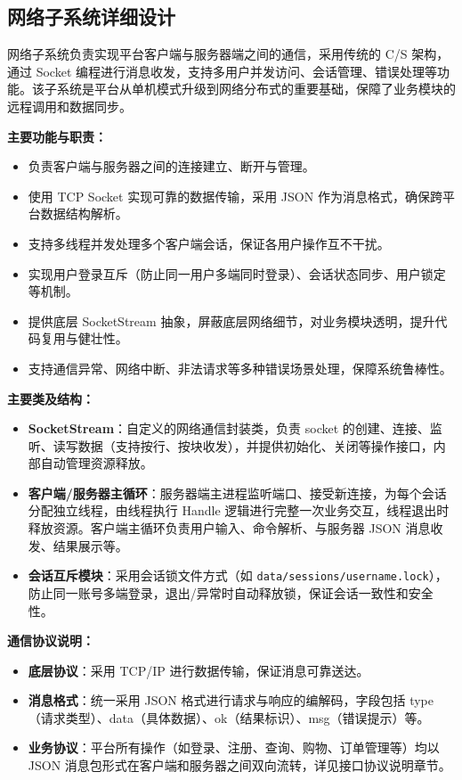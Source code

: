 \documentclass[11pt]{article}
\begin{document}
\subsection{网络子系统详细设计}

网络子系统负责实现平台客户端与服务器端之间的通信，采用传统的 C/S 架构，通过 Socket 编程进行消息收发，支持多用户并发访问、会话管理、错误处理等功能。该子系统是平台从单机模式升级到网络分布式的重要基础，保障了业务模块的远程调用和数据同步。

\vspace{0.5em}
\textbf{主要功能与职责：}
\begin{itemize}
    \item 负责客户端与服务器之间的连接建立、断开与管理。
    \item 使用 TCP Socket 实现可靠的数据传输，采用 JSON 作为消息格式，确保跨平台数据结构解析。
    \item 支持多线程并发处理多个客户端会话，保证各用户操作互不干扰。
    \item 实现用户登录互斥（防止同一用户多端同时登录）、会话状态同步、用户锁定等机制。
    \item 提供底层 SocketStream 抽象，屏蔽底层网络细节，对业务模块透明，提升代码复用与健壮性。
    \item 支持通信异常、网络中断、非法请求等多种错误场景处理，保障系统鲁棒性。
\end{itemize}

\vspace{0.5em}
\textbf{主要类及结构：}
\begin{itemize}
    \item \textbf{SocketStream}：自定义的网络通信封装类，负责 socket 的创建、连接、监听、读写数据（支持按行、按块收发），并提供初始化、关闭等操作接口，内部自动管理资源释放。
    \item \textbf{客户端/服务器主循环}：服务器端主进程监听端口、接受新连接，为每个会话分配独立线程，由线程执行 Handle 逻辑进行完整一次业务交互，线程退出时释放资源。客户端主循环负责用户输入、命令解析、与服务器 JSON 消息收发、结果展示等。
    \item \textbf{会话互斥模块}：采用会话锁文件方式（如 \texttt{data/sessions/username.lock}），防止同一账号多端登录，退出/异常时自动释放锁，保证会话一致性和安全性。
\end{itemize}

\vspace{0.5em}
\textbf{通信协议说明：}
\begin{itemize}
    \item \textbf{底层协议}：采用 TCP/IP 进行数据传输，保证消息可靠送达。
    \item \textbf{消息格式}：统一采用 JSON 格式进行请求与响应的编解码，字段包括 type（请求类型）、data（具体数据）、ok（结果标识）、msg（错误提示）等。
    \item \textbf{业务协议}：平台所有操作（如登录、注册、查询、购物、订单管理等）均以 JSON 消息包形式在客户端和服务器之间双向流转，详见接口协议说明章节。
\end{itemize}
\end{document}

